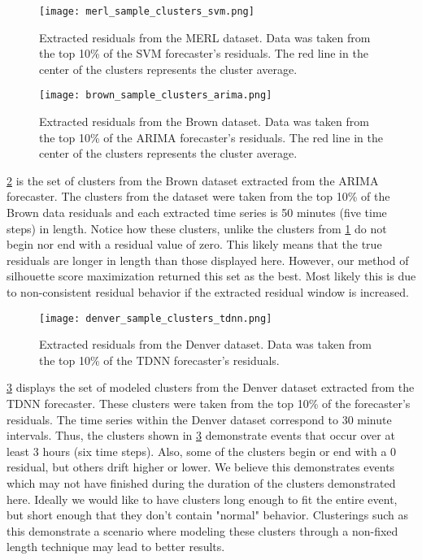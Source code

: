 \begin{figure}
	\begin{center}
		\texttt{[image: merl\_sample\_clusters\_svm.png]}
	\end{center}
	\caption{Extracted residuals from the MERL dataset.  Data was taken from the top 10\% of the SVM forecaster's residuals.  The red line in the center of the clusters represents the cluster average.}
	\label{fig:merl_clusters}
\end{figure}

\begin{figure}
	\begin{center}
		\texttt{[image: brown\_sample\_clusters\_arima.png]}
	\end{center}
	\caption{Extracted residuals from the Brown dataset.  Data was taken from the top 10\% of the ARIMA forecaster's residuals.  The red line in the center of the clusters represents the cluster average.}
	\label{fig:brown_clusters}
\end{figure}

\ref{fig:brown_clusters} is the set of clusters from the Brown dataset extracted from the ARIMA forecaster.  The clusters from the dataset were taken from the top 10\% of the Brown data residuals and each extracted time series is 50 minutes (five time steps) in length.  Notice how these clusters, unlike the clusters from \ref{fig:merl_clusters} do not begin nor end with a residual value of zero.  This likely means that the true residuals are longer in length than those displayed here.  However, our method of silhouette score maximization returned this set as the best.  Most likely this is due to non-consistent residual behavior if the extracted residual window is increased.
  
\begin{figure}
	\begin{center}
		\texttt{[image: denver\_sample\_clusters\_tdnn.png]}
	\end{center}
	\caption{Extracted residuals from the Denver dataset.  Data was taken from the top 10\% of the TDNN forecaster's residuals.}
	\label{fig:denver_clusters}
\end{figure}

\ref{fig:denver_clusters} displays the set of modeled clusters from the Denver dataset extracted from the TDNN forecaster.  These clusters were taken from the top 10\% of the forecaster's residuals.  The time series within the Denver dataset correspond to 30 minute intervals.  Thus, the clusters shown in \ref{fig:denver_clusters} demonstrate events that occur over at least 3 hours (six time steps).  Also, some of the clusters begin or end with a 0 residual, but others drift higher or lower.  We believe this demonstrates events which may not have finished during the duration of the clusters demonstrated here.  Ideally we would like to have clusters long enough to fit the entire event, but short enough that they don't contain "normal" behavior.  Clusterings such as this demonstrate a scenario where modeling these clusters through a non-fixed length technique may lead to better results.

